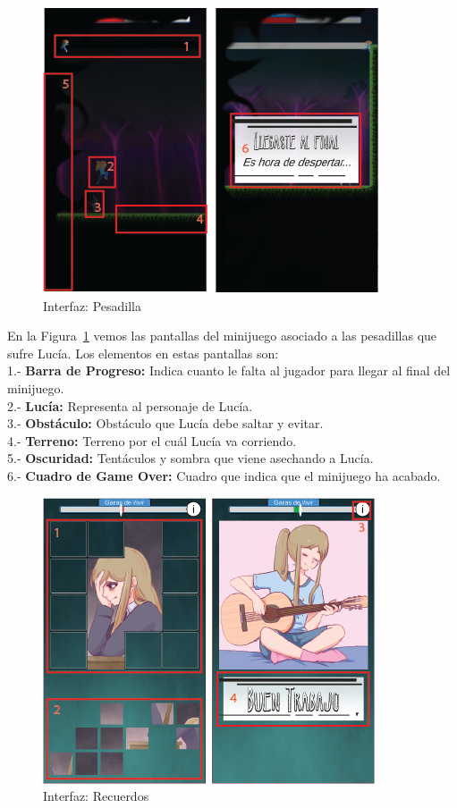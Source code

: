 \newpage
\begin{figure}[ht]
    \centering
    \includegraphics{imgs/hud-pesadilla.png}
    \caption{Interfaz: Pesadilla}
    \label{fig:hud-pesadilla}
\end{figure}

En la Figura~\ref{fig:hud-pesadilla} vemos las pantallas del minijuego asociado a las pesadillas que sufre Lucía. Los elementos en estas pantallas son:\\
1.- \textbf{Barra de Progreso:} Indica cuanto le falta al jugador para llegar al final del minijuego.\\
2.- \textbf{Lucía:} Representa al personaje de Lucía.\\
3.- \textbf{Obstáculo:} Obstáculo que Lucía debe saltar y evitar.\\
4.- \textbf{Terreno:} Terreno por el cuál Lucía va corriendo.\\
5.- \textbf{Oscuridad:} Tentáculos y sombra que viene asechando a Lucía.\\
6.- \textbf{Cuadro de Game Over:} Cuadro que indica que el minijuego ha acabado.

\newpage
\begin{figure}[ht]
    \centering
    \includegraphics{imgs/hud-puzzle.png}
    \caption{Interfaz: Recuerdos}
    \label{fig:hud-recuerdos}
\end{figure}

